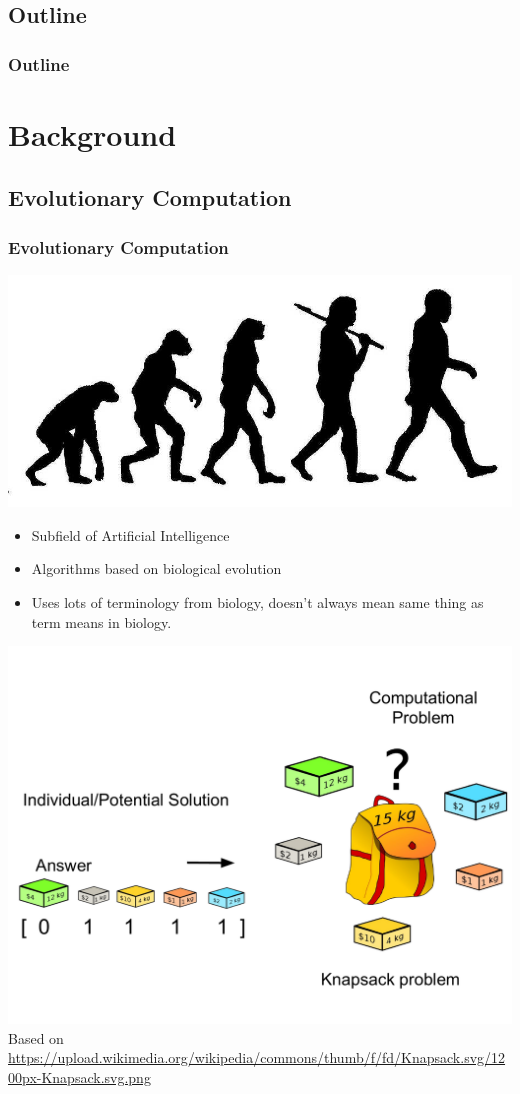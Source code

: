 \documentclass{beamer}
\newcommand{\linespace}{\vskip 0.25cm}
\begin{document}
\subsection*{Outline}

\begin{frame}
	\frametitle{Outline}
	\tableofcontents[hideallsubsections]
\end{frame}

\section[Background]{Background}

\subsection{Evolutionary Computation}

\begin{frame}
	\frametitle{Evolutionary Computation}
	\centering
	\includegraphics[width=.6\textwidth]{Illustrations/evolution.jpg}
	\\
	\large
	\begin{itemize}
		\item Subfield of Artificial Intelligence
		\pause
		\item Algorithms based on biological evolution
		\pause
		\item Uses lots of terminology from biology, doesn't always mean same thing as term means in biology.
	\end{itemize}
\end{frame}

\begin{frame}
	\centering
	\includegraphics[width=.8\textwidth]{Illustrations/gpknapsack_1.PDF}
	\linespace
	\tiny{Based on \url{https://upload.wikimedia.org/wikipedia/commons/thumb/f/fd/Knapsack.svg/1200px-Knapsack.svg.png}}
\end{frame}
\end{document}
